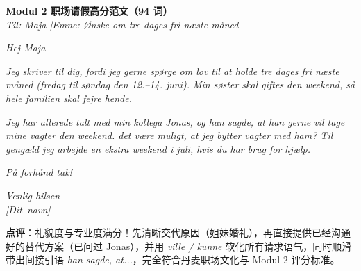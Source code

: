 \begin{answerbox}
\textbf{Modul 2 职场请假高分范文（94 词）}\\
\textit{Til: Maja \quad|\quad Emne: Ønske om tre dages fri næste måned}

\textit{Hej Maja}

\textit{Jeg skriver til dig, fordi jeg gerne  spørge om lov til at holde tre dages fri næste måned (fredag til søndag den 12.--14. juni). Min søster skal giftes den weekend, så hele familien skal fejre hende.}

\textit{Jeg har allerede talt med min kollega Jonas, og han sagde, at han gerne vil tage mine vagter den weekend.  det være muligt, at jeg bytter vagter med ham? Til gengæld  jeg arbejde en ekstra weekend i juli, hvis du har brug for hjælp.}

\textit{På forhånd tak!}

\textit{Venlig hilsen\\
\mbox{[Dit navn]}}

\small\textbf{点评}：礼貌度与专业度满分！先清晰交代原因（姐妹婚礼），再直接提供已经沟通好的替代方案（已问过 Jonas），并用 \textit{ville / kunne} 软化所有请求语气，同时顺滑带出间接引语 \textit{han sagde, at...}，完全符合丹麦职场文化与 Modul 2 评分标准。
\end{answerbox}
